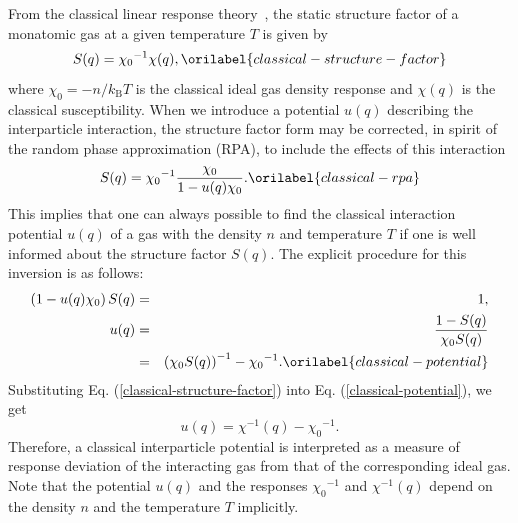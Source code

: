 \documentclass[aps,showkeys,noshowpacs,superscriptaddress,pre,preprint]{revtex4-2}
\let\label\orilabel
\begin{document}
From the classical linear response theory~\cite{Ichimaru1973},
the static structure factor of a monatomic gas at a given temperature $T$ is given by
\begin{equation}
{S(q)} = {\chi_0}^{-1} {\chi (q)},
\label{classical-structure-factor}
\end{equation}
where $\chi_0 = - n/k_\mathrm{B} T$ is the classical ideal gas density response 
and ${\chi (q)}$ is the classical susceptibility.
When we introduce a potential $u(q)$ describing the interparticle interaction, 
the structure factor form may be corrected,  
in spirit of the random phase approximation (RPA), 
to include the effects of this interaction
\begin{equation}
{S(q)} = {\chi_0}^{-1} \frac{\chi_0}{1 - {u(q)} \chi_0} .
\label{classical-rpa}
\end{equation}
This implies that one can always possible 
to find the classical interaction potential ${u(q)}$ of a gas with the density $n$ and temperature $T$
if one is well informed about the structure factor ${S(q)}$.
The explicit procedure for this inversion is as follows: 
\begin{eqnarray}
\left( 1 - {u(q)} \chi_0 \right) {S(q)} &=& 1, \nonumber\\
{u(q)} &=& \frac{1- {S(q)}}{\chi_0 S(q) } \nonumber\\
&=& \left( {\chi_0} {S(q)} \right)^{-1} - {\chi_0}^{-1} .
\label{classical-potential}
\end{eqnarray}
Substituting Eq. (\ref{classical-structure-factor}) into Eq. (\ref{classical-potential}), we get
\begin{equation}
{u(q)} = \chi^{-1} (q) - {\chi_0}^{-1}.
\end{equation}
Therefore, a classical interparticle potential is interpreted as a measure of response deviation of the interacting gas from that of the corresponding ideal gas.
Note that the potential ${u(q)}$ and the responses ${\chi_0}^{-1}$ and ${\chi}^{-1} (q)$ depend 
on the density $n$ and the temperature $T$ implicitly.
\end{document}
